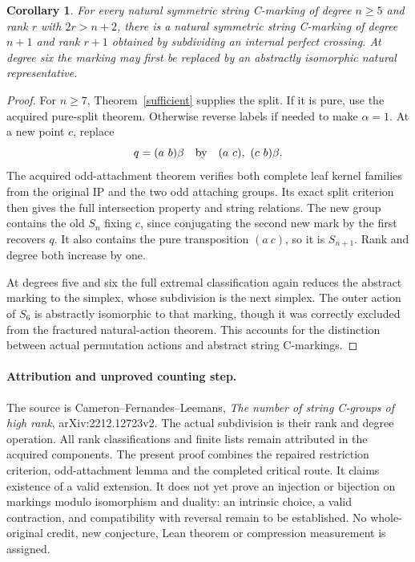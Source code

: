 \documentclass[11pt,a4paper]{article}
\newtheorem{corollary}[theorem]{Corollary}
\begin{document}
\begin{corollary}\label{extension}
For every natural symmetric string C-marking of degree $n\ge5$
and rank $r$ with $2r>n+2$, there is a natural symmetric string
C-marking of degree $n+1$ and rank $r+1$ obtained by subdividing
an internal perfect crossing. At degree six the marking may first
be replaced by an abstractly isomorphic natural representative.
\end{corollary}
\begin{proof}
For $n\ge7$, Theorem~\ref{sufficient} supplies the split. If it
is pure, use the acquired pure-split theorem. Otherwise reverse
labels if needed to make $\alpha=1$. At a new point $c$, replace
\[
                  q=(a\ b)\beta
       \quad\hbox{by}\quad (a\ c),\ (c\ b)\beta.
\]
The acquired odd-attachment theorem verifies both complete leaf
kernel families from the original IP and the two odd attaching
groups. Its exact split criterion then gives the full intersection
property and string relations. The new group contains the old
$S_n$ fixing $c$, since conjugating the second new mark by the
first recovers $q$. It also contains the pure transposition $(a\ c)$,
so it is $S_{n+1}$. Rank and degree both increase by one.

At degrees five and six the full extremal classification again
reduces the abstract marking to the simplex, whose subdivision is
the next simplex. The outer action of $S_6$ is abstractly isomorphic
to that marking, though it was correctly excluded from the fractured
natural-action theorem. This accounts for the distinction between
actual permutation actions and abstract string C-markings.
\end{proof}

\paragraph{Attribution and unproved counting step.}
The source is Cameron--Fernandes--Leemans, \emph{The number of
string C-groups of high rank}, arXiv:2212.12723v2. The actual
subdivision is their rank and degree operation. All rank
classifications and finite lists remain attributed in the acquired
components. The present proof combines the repaired restriction
criterion, odd-attachment lemma and the completed critical route.
It claims existence of a valid extension. It does not yet prove
an injection or bijection on markings modulo isomorphism and
duality: an intrinsic choice, a valid contraction, and compatibility
with reversal remain to be established. No whole-original credit,
new conjecture, Lean theorem or compression measurement is assigned.
\end{document}
